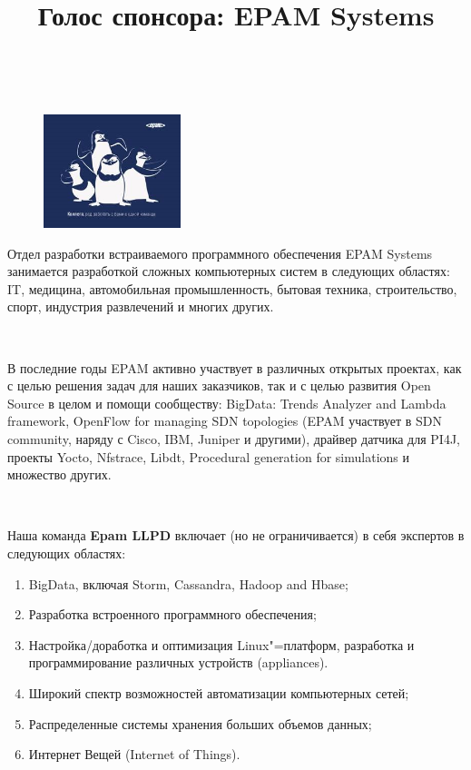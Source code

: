 \documentclass[10pt, a5paper]{article}
\begin{document}
\title{Голос спонсора: EPAM Systems}
\date{}
\maketitle

~

\begin{figure}[h!]
\centering
\includegraphics[width=4cm]{50_spons_epam.jpg}
\end{figure}



Отдел разработки встраиваемого программного обеспечения \linebreak EPAM Systems занимается разработкой сложных компьютерных систем в следующих областях:
IT,  медицина,  автомобильная промышленность,  бытовая техника,  строительство,  спорт,  индустрия развлечений и многих других.

~

В последние годы EPAM активно участвует в различных открытых проектах, 
как с целью решения задач для наших заказчиков, так и с целью развития Open Source в целом и помощи сообществу:
BigData: Trends Analyzer and Lambda framework, 
OpenFlow for managing SDN topologies (EPAM участвует в SDN community,  наряду с Cisco,  IBM,  Juniper и другими), 
драйвер датчика для PI4J, проекты Yocto,  Nfstrace, Libdt, Procedural generation for simulations и множество других.

~

Наша команда {\bf Epam LLPD} включает (но не ограничивается) в себя экспертов в следующих областях: 

\begin{enumerate}
	\item BigData, включая Storm,  Cassandra,  Hadoop and Hbase;
    \item Разработка встроенного программного обеспечения; 
    \item Настройка/доработка и оптимизация Linux"=платформ, разработка и программирование различных устройств (appliances).
    \item Широкий спектр возможностей автоматизации компьютерных сетей; 
    \item Распределенные системы хранения больших объемов данных;
    \item Интернет Вещей (Internet of Things).
\end{enumerate}
\end{document}
